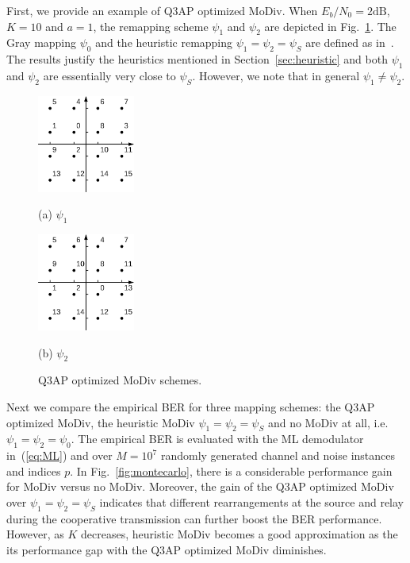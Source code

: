 \documentclass[journal,draftcls,onecolumn,12pt,twoside]{IEEEtran}
\begin{document}
First, we provide an example of Q3AP optimized MoDiv. When $E_b/N_0 =
2\mbox{dB}$, $K = 10$ and $a = 1$, the remapping scheme $\psi_1$ and $\psi_2$
are depicted in Fig.~\ref{fig:example}. The Gray mapping $\psi_0$ and the
heuristic remapping $\psi_1=\psi_2=\psi_S$ are defined as
in~\cite{seddik2008trans}. The results justify the heuristics mentioned in
Section~\ref{sec:heuristic} and both $\psi_1$ and $\psi_2$ are essentially very
close to $\psi_S$. However, we note that in general $\psi_1\not=\psi_2$.

\begin{figure}[!t]
    \begin{minipage}[b]{0.48\linewidth}
      \centering
      \centerline{\includegraphics[width=3.2cm]{./figs/psi1.eps}}
      \centerline{(a) $\psi_1$}\medskip
    \end{minipage}
    \hfill
    \begin{minipage}[b]{.48\linewidth}
      \centering
      \centerline{\includegraphics[width=3.2cm]{./figs/psi2.eps}}
      \centerline{(b) $\psi_2$}\medskip
    \end{minipage}
    \caption{Q3AP optimized MoDiv schemes.}
    \label{fig:example}
\end{figure}

Next we compare the empirical BER for three mapping schemes: the Q3AP optimized
MoDiv, the heuristic MoDiv $\psi_1 = \psi_2 = \psi_S$  and no MoDiv at all, i.e.
$\psi_1 = \psi_2 = \psi_0$. The empirical BER is evaluated with the ML
demodulator in~(\ref{eq:ML}) and over $M=10^7$ randomly generated channel and
noise instances and indices $p$. In Fig.~\ref{fig:montecarlo}, there is a
considerable performance gain for MoDiv versus no MoDiv. Moreover, the gain of
the Q3AP optimized MoDiv over $\psi_1 = \psi_2 = \psi_S$ indicates that
different rearrangements at the source and relay during the cooperative
transmission can further boost the BER performance. However, as $K$ decreases,
heuristic MoDiv becomes a good approximation as the its performance gap with the
Q3AP optimized MoDiv diminishes.
\end{document}
